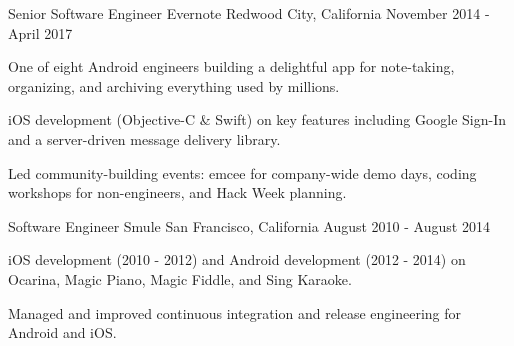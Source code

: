 \begin{cventries}
  \cventry
    {Senior Software Engineer} %
    {Evernote} %
    {Redwood City, California} %
    {November 2014 - April 2017} %
    {
	\begin{cvitems} %
      	\item {One of eight Android engineers building a delightful app for note-taking, organizing, and archiving everything used by millions.}
	\item {iOS development (Objective-C \& Swift) on key features including Google Sign-In and a server-driven message delivery library.}
	\item {Led community-building events: emcee for company-wide demo days, coding workshops for non-engineers, and Hack Week planning.}
	\end{cvitems}
    }
    
  \cventry
    {Software Engineer} %
    {Smule} %
    {San Francisco, California} %
    {August 2010 - August 2014} %
    {
      \begin{cvitems} %
       \item {iOS development (2010 - 2012) and Android development (2012 - 2014) on Ocarina, Magic Piano, Magic Fiddle, and Sing Karaoke.}
        \item {Managed and improved continuous integration and release engineering for Android and iOS.}
      \end{cvitems}
    }
    

\end{cventries}
